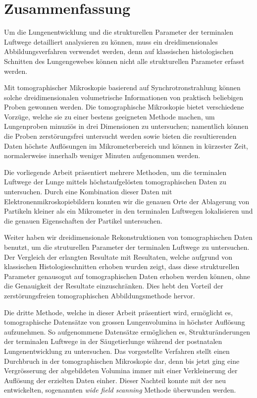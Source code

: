 \acresetall
{}%
\hfill
\vfill
\begingroup%
\let\clearpage\relax%
\let\cleardoublepage\relax%
\let\cleardoublepage\relax%
%
\chapter*{Zusammenfassung}
Um die Lungenentwicklung und die strukturellen Parameter der terminalen Luftwege detailliert analysieren zu können, muss ein dreidimensionales Abbildungsverfahren verwendet werden, denn auf klassischen histologischen Schnitten des Lungengewebes können nicht alle strukturellen Parameter erfasst werden.

Mit tomographischer Mikroskopie basierend auf Synchrotronstrahlung können solche dreidimensionalen volumetrische Informationen von praktisch beliebigen Proben gewonnen werden. Die tomographische Mikroskopie bietet verschiedene Vorzüge, welche sie zu einer bestens geeigneten Methode machen, um Lungenproben minuziös in drei Dimensionen zu untersuchen; namentlich können die Proben zerstörungsfrei untersucht werden sowie bieten die resultierenden Daten höchste Auflösungen im Mikrometerbereich und können in kürzester Zeit, normalerweise innerhalb weniger Minuten aufgenommen werden.

Die vorliegende Arbeit präsentiert mehrere Methoden, um die terminalen Luftwege der Lunge mittels höchstaufgelösten tomographischen Daten zu untersuchen. Durch eine Kombination dieser Daten mit Elektronenmikroskopiebildern konnten wir die genauen Orte der Ablagerung von Partikeln kleiner als ein Mikrometer in den terminalen Luftwegen lokalisieren und die genauen Eigenschaften der Partikel untersuchen.

Weiter haben wir dreidimensionale Rekonstruktionen von tomographischen Daten benutzt, um die struturellen Parameter der terminalen Luftwege zu untersuchen. Der Vergleich der erlangten Resultate mit Resultaten, welche aufgrund von klassischen Histologieschnitten erhoben wurden zeigt, dass diese strukturellen Parameter genausogut auf tomographischen Daten erhoben werden können, ohne die Genauigkeit der Resultate einzuschränken. Dies hebt den Vorteil der zerstörungsfreien tomographischen Abbildungsmethode hervor.

Die dritte Methode, welche in dieser Arbeit präsentiert wird, ermöglicht es, tomographische Datensätze von grossen Lungenvolumina in höchster Auflösung aufzunehmen. So aufgenommene Datensätze ermöglichen es, Strukturänderungen der terminalen Luftwege in der Säugetierlunge während der postnatalen Lungenentwicklung zu untersuchen. Das vorgestellte Verfahren stellt einen Durchbruch in der tomographischen Mikroskopie dar, denn bis jetzt ging eine Vergrösserung der abgebildeten Volumina immer mit einer Verkleinerung der Auflösung der erzielten Daten einher. Dieser Nachteil konnte mit der neu entwickelten, sogenannten \emph{wide field scanning} Methode überwunden werden.%
%
\endgroup%